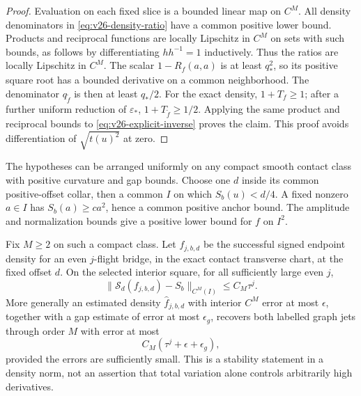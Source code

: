 \begin{proof}
Evaluation on each fixed slice is a bounded linear map on \(C^M\).
All density denominators in \eqref{eq:v26-density-ratio} have a common
positive lower bound.  Products and reciprocal functions are locally
Lipschitz in \(C^M\) on sets with such bounds, as follows by differentiating
\(hh^{-1}=1\) inductively.  Thus the ratios are locally Lipschitz in
\(C^M\).  The scalar \(1-R_f(a,a)\) is at least \(q_*^2\), so its
positive square root has a bounded derivative on a common neighborhood.
The denominator \(q_{\widetilde f}\) is then at least \(q_*/2\).
For the exact density, \(1+T_f\ge1\); after a further uniform reduction of
\(\varepsilon_*\), \(1+T_{\widetilde f}\ge1/2\).  Applying the same
product and reciprocal bounds to \eqref{eq:v26-explicit-inverse} proves the
claim.  This proof avoids differentiation of \(\sqrt{t(u)^2}\) at zero.
\end{proof}

The hypotheses can be arranged uniformly on any compact smooth contact
class with positive curvature and gap bounds.  Choose one \(d\) inside its
common positive-offset collar, then a common \(I\) on which
\(S_b(u)<d/4\).  A fixed nonzero \(a\in I\) has
\(S_b(a)\ge c a^2\), hence a common positive anchor bound.  The amplitude
and normalization bounds give a positive lower bound for \(f\) on \(I^2\).

\begin{corollary}
\label{cor:v26-finite-flight-inverse}
Fix \(M\ge2\) on such a compact class.  Let \(f_{j,b,d}\) be the successful
signed endpoint density for an even \(j\)-flight bridge, in the exact
contact transverse chart, at the fixed offset \(d\).  On the selected
interior square, for all sufficiently large even \(j\),
\begin{equation}\label{eq:v26-finite-density-error}
 \|\mathcal S_d(f_{j,b,d})-S_b\|_{C^M(I)}\le C_M\tau^j.
\end{equation}
More generally an estimated density \(\widehat f_{j,b,d}\) with interior
\(C^M\) error at most \(\epsilon\), together with a gap estimate of error
at most \(\epsilon_g\), recovers both labelled graph jets through order
\(M\) with error at most
\begin{equation}\label{eq:v26-jet-error}
                   C_M(\tau^j+\epsilon+\epsilon_g),
\end{equation}
provided the errors are sufficiently small.  This is a stability statement
in a density norm, not an assertion that total variation alone controls
arbitrarily high derivatives.
\end{corollary}

